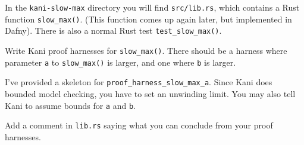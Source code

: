 In the \texttt{kani-slow-max} directory you will find \texttt{src/lib.rs}, which contains a Rust
function \texttt{slow\_max()}. (This function comes up again later, but implemented in Dafny).
There is also a normal Rust test \texttt{test\_slow\_max()}.

Write Kani proof harnesses for \texttt{slow\_max()}. There should be a harness where
parameter \texttt{a} to \texttt{slow\_max()} is larger, and one where \texttt{b} is larger.

I've provided a skeleton for \texttt{proof\_harness\_slow\_max\_a}.
Since Kani does bounded model checking, you have to set an unwinding
limit. You may also tell Kani to assume bounds for \texttt{a} and
\texttt{b}.

Add a comment in \texttt{lib.rs} saying what you can conclude from
your proof harnesses.
